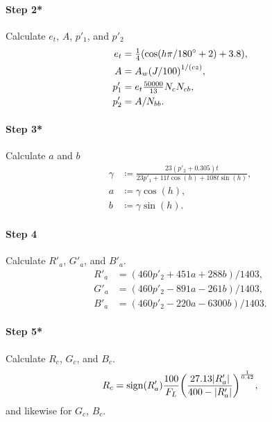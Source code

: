 \documentclass[twocolumn]{scrartcl}
\theoremstyle{named}
\DeclarePairedDelimiter\abs{\lvert}{\rvert}%
\DeclareMathOperator{\sign}{sign}
\begin{document}
\paragraph{Step 2*}{%
Calculate $e_t$, $A$, $p'_1$, and $p'_2$
\begin{align*}
  e_t &= \tfrac{1}{4} (\cos(h\pi/180\degree + 2) + 3.8),\\
  A &= A_w  {(J/100)}^{1/(cz)},\\
  p'_1 &= e_t \tfrac{50000}{13} N_c N_{cb},\\
  p'_2 &= A / N_{bb}.
\end{align*}}
\paragraph{Step 3*}{%
Calculate $a$ and $b$
  \begin{align*}
    \gamma &\coloneqq \frac{23 (p'_2+0.305) t}{23 p'_1 + 11 t \cos(h) + 108 t \sin(h)},\\
    a &\coloneqq \gamma \cos(h),\\
    b &\coloneqq \gamma \sin(h).
  \end{align*}}

\paragraph{Step 4}{%
  Calculate $R'_a$, $G'_a$, and $B'_a$.
  \begin{align*}
    R'_a &= (460 p'_2 + 451 a + 288 b) / 1403,\\
    G'_a &= (460 p'_2 - 891 a - 261 b) / 1403,\\
    B'_a &= (460 p'_2 - 220 a - 6300 b) / 1403.
  \end{align*}%
  }

\paragraph{Step 5*}{%
  Calculate $R_c$, $G_c$, and $B_c$.
  \[
    R_c = \sign(R'_a) \frac{100}{F_L} {\left(\frac{27.13 \abs{R'_a}}{400 - \abs{R'_a}}\right)}^{\frac{1}{0.42}},
  \]
and likewise for $G_c$, $B_c$.}



\end{document}
